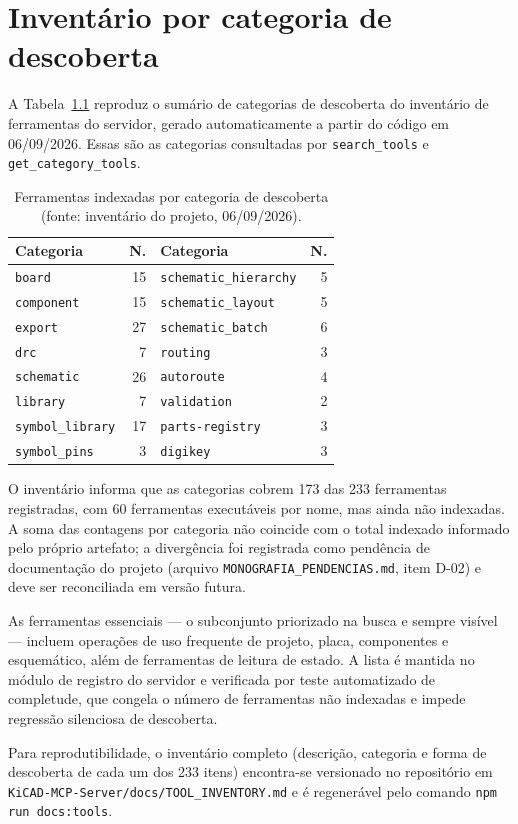 \chapter{Inventário por categoria de descoberta}\label{ap:inventario}

A Tabela~\ref{tab:categorias-ap} reproduz o sumário de categorias de
descoberta do inventário de ferramentas do servidor, gerado automaticamente
a partir do código em 06/09/2026. Essas são as categorias consultadas por
\texttt{search\_tools} e \texttt{get\_category\_tools}.

\begin{table}[htbp]
\centering
\small
\caption{Ferramentas indexadas por categoria de descoberta (fonte: inventário
do projeto, 06/09/2026).}
\label{tab:categorias-ap}
\begin{tabular}{@{}lrlr@{}}
\toprule
\textbf{Categoria} & \textbf{N.} & \textbf{Categoria} & \textbf{N.} \\
\midrule
\texttt{board} & 15 & \texttt{schematic\_hierarchy} & 5 \\
\texttt{component} & 15 & \texttt{schematic\_layout} & 5 \\
\texttt{export} & 27 & \texttt{schematic\_batch} & 6 \\
\texttt{drc} & 7 & \texttt{routing} & 3 \\
\texttt{schematic} & 26 & \texttt{autoroute} & 4 \\
\texttt{library} & 7 & \texttt{validation} & 2 \\
\texttt{symbol\_library} & 17 & \texttt{parts-registry} & 3 \\
\texttt{symbol\_pins} & 3 & \texttt{digikey} & 3 \\
\bottomrule
\end{tabular}
\end{table}

O inventário informa que as categorias cobrem 173 das 233 ferramentas
registradas, com 60 ferramentas executáveis por nome, mas ainda não
indexadas. A soma das contagens por categoria não coincide com o total
indexado informado pelo próprio artefato; a divergência foi registrada como
pendência de documentação do projeto (arquivo
\texttt{MONOGRAFIA\_PENDENCIAS.md}, item D-02) e deve ser reconciliada em
versão futura.

As ferramentas essenciais --- o subconjunto priorizado na busca e sempre
visível --- incluem operações de uso frequente de projeto, placa,
componentes e esquemático, além de ferramentas de leitura de estado. A lista
é mantida no módulo de registro do servidor e verificada por teste
automatizado de completude, que congela o número de ferramentas não
indexadas e impede regressão silenciosa de descoberta.

Para reprodutibilidade, o inventário completo (descrição, categoria e forma
de descoberta de cada um dos 233 itens) encontra-se versionado no repositório
em \texttt{KiCAD-MCP-Server/docs/TOOL\_INVENTORY.md} e é regenerável pelo
comando \texttt{npm run docs:tools}.
